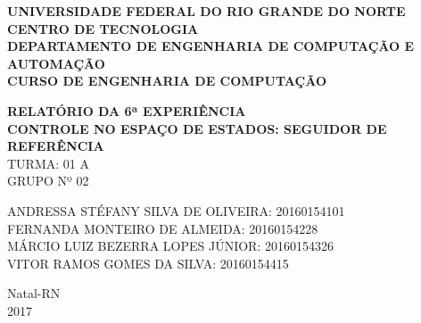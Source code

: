 \documentclass[a4paper,12pt]{article}
\begin{document}
\onehalfspacing

\thispagestyle{empty}

\setcounter{page}{1}


\begin{figure}[!ht]

\centering

\hspace{11.09cm}

\label{Logos}

\end{figure}


\vspace{-1cm}

\begin{center}
{\bf{\normalsize UNIVERSIDADE FEDERAL DO RIO GRANDE DO NORTE\\
CENTRO DE TECNOLOGIA\\
DEPARTAMENTO DE ENGENHARIA DE COMPUTAÇÃO E AUTOMAÇÃO\\
CURSO DE ENGENHARIA DE COMPUTAÇÃO
}}


\vspace{3.6cm}

{\bf{\large RELATÓRIO DA 6ª EXPERIÊNCIA\\
CONTROLE NO ESPAÇO DE ESTADOS: SEGUIDOR DE REFERÊNCIA\\
}}
\vspace{1.5cm}
{\large TURMA: 01 A\\
	GRUPO Nº 02}


\vspace{3.6cm}


\begin{flushright}
\begin{normalsize}
ANDRESSA STÉFANY SILVA DE OLIVEIRA: 20160154101\\
\vspace{0.8cm}
FERNANDA MONTEIRO DE ALMEIDA: 20160154228\\
\vspace{0.8cm}
MÁRCIO LUIZ BEZERRA LOPES JÚNIOR: 20160154326\\
\vspace{0.8cm}
VITOR RAMOS GOMES DA SILVA: 20160154415\\
\end{normalsize}
\end{flushright}


\vspace{2.5cm}

{\large Natal-RN\\
2017}

\end{center}
\end{document}
